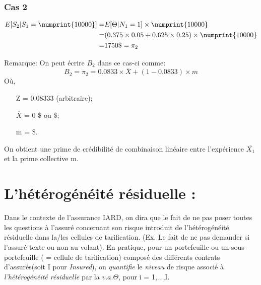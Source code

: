 \documentclass[11pt,french]{report}
\begin{document}
\subsubsection*{Cas 2}
\begin{align*}
E[S_2|S_1 = \numprint{10000}] =& E[\Theta|N_1 = 1] \times  \numprint{10000} \\
=& (0.375\times 0.05 + 0.625\times 0.25) \times  \numprint{10000}\\
=& 1750\$ = \pi_2
\end{align*}

Remarque: On peut écrire $B_2$ dans ce cas-ci comme:
\begin{equation}
B_2 = \pi_2 = 0.0833 \times  \overline{X} + (1 - 0.0833) \times  m
\end{equation}
Où,
\begin{itemize}
\item[Z] = 0.08333 (arbitraire);
\item[$\overline{X}$] = 0 \$ ou \$;
\item[m] =  \$.
\end{itemize}
On obtient une prime de crédibilité de combinaison linéaire entre l'expérience $\overline{X_1}$ et la prime collective m.

\section{L'hétérogénéité résiduelle :}
Dans le contexte de l'assurance IARD, on dira que le fait de ne pas poser toutes les questions à l'assuré concernant son risque introduit de l'hétérogénéité résiduelle dans la/les cellules de tarification. (Ex. Le fait de ne pas demander si l'assuré texte ou non au volant). En pratique, pour un portefeuille ou un sous-portefeuille ( = cellule de tarification) composé des différents contrats d'assurés(soit I pour \emph{Insured}), on \emph{quantifie} le \emph{niveau} de risque associé à \emph{l'hétérogénéité résiduelle} par la $v.a.  \Theta$, pour i = 1,...,I.
\end{document}
